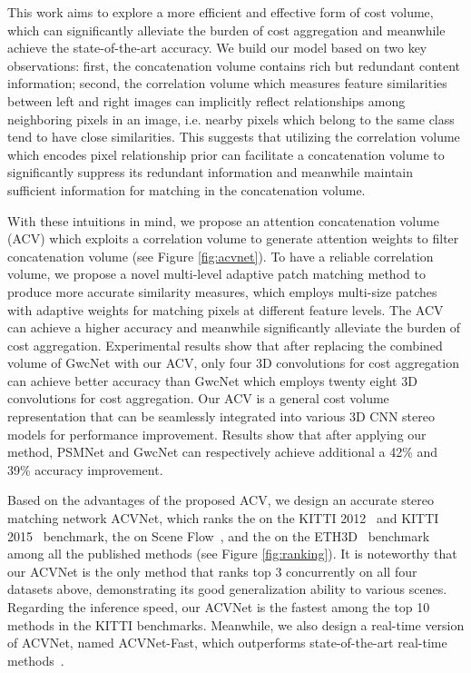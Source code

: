 \documentclass[10pt,twocolumn,letterpaper]{article}
\begin{document}
This work aims to explore a more efficient and effective form of cost volume, which can significantly alleviate the burden of cost aggregation
and meanwhile achieve the state-of-the-art accuracy. 
We build our model based on two key observations: first, the concatenation volume contains rich but redundant content information;
second, the correlation volume which measures feature similarities between left and right images can implicitly reflect relationships among neighboring pixels in an image, i.e. nearby pixels which belong to the same class tend to have close similarities. This suggests that utilizing the correlation volume which encodes pixel relationship prior can facilitate a concatenation volume to significantly suppress its redundant information and meanwhile maintain sufficient information for matching in the concatenation volume.

With these intuitions in mind, 
we propose an attention concatenation volume (ACV) which exploits a correlation volume to generate attention weights to filter concatenation volume (see Figure \ref{fig:acvnet}). To have a reliable correlation volume, we propose a novel multi-level adaptive patch matching method to produce more accurate similarity measures, which employs multi-size patches with adaptive weights for matching pixels at different feature levels. The ACV can achieve a higher accuracy and meanwhile significantly alleviate the burden of cost aggregation. Experimental results show that after replacing the combined volume of GwcNet with our ACV, only four 3D convolutions for cost aggregation can achieve better accuracy than GwcNet which employs twenty eight 3D convolutions for cost aggregation. Our ACV is a general cost volume representation that can be seamlessly integrated into various 3D CNN stereo models for performance improvement. Results show that after applying our method, PSMNet and GwcNet  can respectively achieve additional a 42\% and 39\% accuracy improvement.


Based on the advantages of the proposed ACV, we design an accurate stereo matching network ACVNet, which ranks the  on the KITTI 2012~\cite{geiger2012we} and KITTI 2015~\cite{menze2015joint} benchmark, the  on Scene Flow~\cite{dispNetC2016large}, and the  on the ETH3D~\cite{schops2017multi} benchmark among all the published methods (see Figure \ref{fig:ranking}). 
It is noteworthy that our ACVNet is the only method that ranks top 3 concurrently on all four datasets above, demonstrating its good generalization ability to various scenes. Regarding the inference speed, our ACVNet is the fastest among the top 10 methods in the KITTI benchmarks.
Meanwhile, we also design a real-time version of ACVNet, named ACVNet-Fast, which outperforms state-of-the-art real-time methods~\cite{stereonet2018, xu2020aanet, deeppruner2019, yao2021decomposition}.
\vspace{0.1cm}
\end{document}
